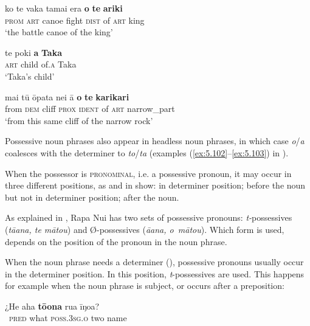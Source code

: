 \ea\label{ex:6.1}
\gll ko te vaka tama{\ꞌ}i era \textbf{o} \textbf{te} \textbf{{\ꞌ}ariki} \\
\textsc{prom} \textsc{art} canoe fight \textsc{dist} of \textsc{art} king \\

\glt 
‘the battle canoe of the king’ \textstyleExampleref{[R345.013]} 
\z

\ea\label{ex:6.2}
\gll te poki \textbf{{\ꞌ}a} \textbf{Taka} \\
\textsc{art} child of\textsc{.a} Taka \\

\glt 
‘Taka’s child’ \textstyleExampleref{[Mtx-3-03.024]}
\z

\ea\label{ex:6.3}
\gll mai tū {\ꞌ}ōpata nei {\ꞌ}ā \textbf{o} \textbf{te} \textbf{karikari} \\
from \textsc{dem} cliff \textsc{prox} \textsc{ident} of \textsc{art} narrow\_part \\

\glt
‘from this same cliff of the narrow rock’ \textstyleExampleref{[R112.011]} 
\z

Possessive noun phrases also appear in headless noun phrases, in which case \textit{o}/\textit{{\ꞌ}a} coalesces with the determiner to \textit{to}/\textit{ta} (examples (\ref{ex:5.102}–\ref{ex:5.103}) in ).

When the possessor is \textsc{pronominal}, i.e. a possessive pronoun, it may occur in three different positions, as  and  in  show: in determiner position; before the noun but not in determiner position; after the noun.

As explained in , Rapa Nui has two sets of possessive pronouns: \textit{t-}possessives (\textit{tā{\ꞌ}ana, te mātou}) and Ø-possessives (\textit{{\ꞌ}ā{\ꞌ}ana, o~mātou}). Which form is used, depends on the position of the pronoun in the noun phrase. 

When the noun phrase needs a determiner (), possessive pronouns usually occur in the determiner position. In this position, \textit{t}{}-possessives are used. This happens for example when the noun phrase is subject, or occurs after a preposition:

\ea\label{ex:6.4}
\gll ¿He aha \textbf{tō{\ꞌ}ona} rua {\ꞌ}īŋoa? \\
~\textsc{pred} what \textsc{poss.3sg.o} two name \\

